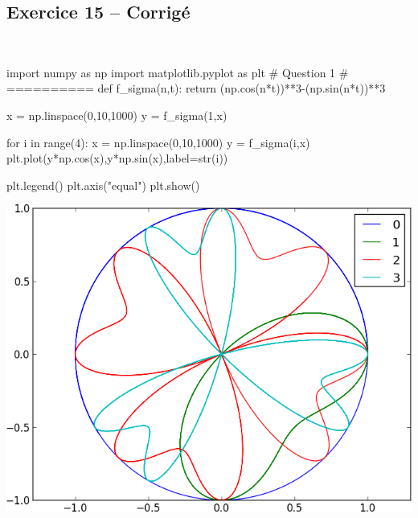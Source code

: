 \documentclass[10pt,fleqn]{article} %
\begin{document}
\begin{multicols}{2}
\columnbreak
{}
\subsection*{Exercice 15 -- Corrigé}

\begin{corrige}
$\quad$
\begin{python}
import numpy as np
import matplotlib.pyplot as plt
# Question 1 
# ==========
def f_sigma(n,t):
    return (np.cos(n*t))**3-(np.sin(n*t))**3

x = np.linspace(0,10,1000)
y = f_sigma(1,x)

for i in range(4):
    x = np.linspace(0,10,1000)
    y = f_sigma(i,x)
    plt.plot(y*np.cos(x),y*np.sin(x),label=str(i))

plt.legend()
plt.axis("equal")    
plt.show()
\end{python}
\end{corrige}
\begin{center}
\includegraphics[width=.9\linewidth]{images/exo_15}
\end{center}



\end{multicols}
\end{document}

